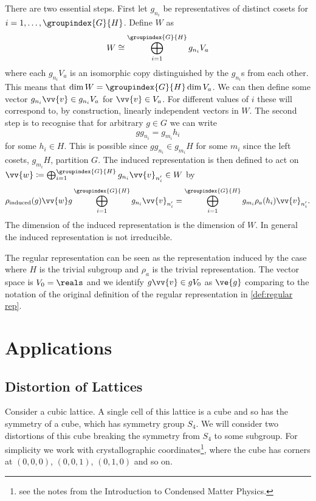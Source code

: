 There are two essential steps.
First let \(g_{n_i}\) be representatives of distinct cosets for \(i = 1,
\dotsc, \groupindex{G}{H}\).
Define \(W\) as
\begin{equation}
    W \isomorphic \bigoplus_{i = 1}^{\groupindex{G}{H}} g_{n_i} V_a
\end{equation}
where each \(g_{n_i}V_a\) is an isomorphic copy distinguished by the
\(g_{n_i}\)s from each other.
This means that \(\dim W = \groupindex{G}{H}\dim V_a\).
We can then define some vector \(g_{n_i}\vv{v} \in g_{n_i}V_a\) for \(\vv{v}
\in V_a\).
For different values of \(i\) these will correspond to, by construction,
linearly independent vectors in \(W\).
The second step is to recognise that for arbitrary \(g \in G\) we can write
\begin{equation}
    g g_{n_i} = g_{m_i} h_i
\end{equation}
for some \(h_i \in H\).
This is possible since \(gg_{n_i} \in g_{m_i}H\) for some \(m_i\) since the
left cosets, \(g_{m_i}H\), partition \(G\).
The induced representation is then defined to act on \(\vv{w} \coloneqq
\bigoplus_{i = 1}^{\groupindex{G}{H}} g_{n_i}\vv{v}_{n'_i} \in W\) by
\begin{equation}
    \rho_{\mathrm{induced}}(g) \vv{w} g \bigoplus_{i =
        1}^{\groupindex{G}{H}} g_{n_i}\vv{v}_{n'_i} = \bigoplus_{i =
        1}^{\groupindex{G}{H}} g_{m_i} \rho_a(h_i) \vv{v}_{n'_i}.
\end{equation}
The dimension of the induced representation is the dimension of \(W\).
In general the induced representation is not irreducible.

The regular representation can be seen as the representation induced by the
case where \(H\) is the trivial subgroup and \(\rho_a\) is the trivial
representation.
The vector space is \(V_0 = \reals\) and we identify \(g\vv{v} \in gV_0\) as
\(\ve{g}\) comparing to the notation of the original definition of the regular
representation in \cref{def:regular rep}.

\section{Applications}
\subsection{Distortion of Lattices}
Consider a cubic lattice.
A single cell of this lattice is a cube and so has the symmetry of a cube,
which has symmetry group \(S_4\).
We will consider two distortions of this cube breaking the symmetry from
\(S_4\) to some subgroup.
For simplicity we work with crystallographic coordinates\footnote{see the notes from the Introduction to Condensed Matter Physics.}, where the cube has
corners at \((0, 0, 0)\), \((0, 0, 1)\), \((0, 1, 0)\) and so on.

